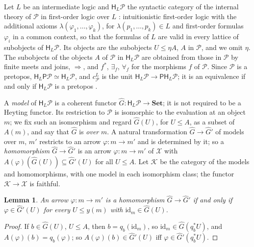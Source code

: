 \documentclass[11pt]{amsart}
\newtheorem{lem}[thm]{Lemma}
\theoremstyle{definition}
\newcommand{\Set}{\mathbf{Set}}
\newcommand{\PP}{\mathsf P}
\newcommand{\HH}{\mathsf H}
\newcommand{\cX}{\mathcal X}
\newcommand{\cP}{\mathcal P}
\newcommand{\cK}{\mathcal K}
\newcommand{\id}{\mathrm{id}}
\begin{document}
Let $L$ be an intermediate logic and $\HH_L\cP$ the syntactic category
of the internal theory of $\cP$ in first-order logic over $L$
\cite[\S2]{Interm}: intuitionistic first-order logic with the
additional axioms $\lambda(\varphi_1,\dots,\varphi_k)$, for
$\lambda(p_1,\dots,p_k)\in L$ and first-order formulas $\varphi_i$ in
a common context, so that the formulas of $L$ are valid in every
lattice of subobjects of $\HH_L\cP$. Its objects are the subobjects
$U\le\eta A$, $A$ in $\cP$, and we omit $\eta$. The subobjects of the objects $A$ of $\cP$
in $\HH_L\cP$ are obtained from those in $\cP$ by finite meets and
joins, $\Rightarrow$, and $f^*$, $\exists_f$, $\forall_f$ for the
morphisms $f$ of $\cP$. Since $\cP$ is a pretopos, $\HH_L\PP\cP\simeq
\HH_L\cP$, and $c^L_\cP$ is the unit $\HH_L\cP\to\PP\HH_L\cP$; it is an
equivalence if and only if $\HH_L\cP$ is a pretopos
\cite[Lemma~2.2]{Interm}.

A \emph{model} of $\HH_L\cP$ is a coherent functor $\hat G\colon
\HH_L\cP\to\Set$; it is not required to be a Heyting functor. Its restriction to $\cP$ is isomorphic to the
evaluation at an object $m$; we fix such an isomorphism and regard
$\hat G(U)$, for $U\le A$, as a subset of $A(m)$, and say that $\hat G$
is \emph{over} $m$. A natural transformation $\hat G\to\hat G'$ of
models over $m$, $m'$ restricts to an arrow $\varphi\colon m\to m'$ and
is determined by it; so a \emph{homomorphism} $\hat G\to\hat G'$ is an
arrow $\varphi\colon m\to m'$ of $\cX$ with $A(\varphi)(\hat G(U))
\subseteq\hat G'(U)$ for all $U\le A$. Let $\cK$ be the category of the
models and homomorphisms, with one model in each isomorphism class; the
functor $\cK\to\cX$ is faithful.

\begin{lem}\label{lem:generic}
An arrow $\varphi\colon m\to m'$ is a homomorphism $\hat G\to\hat G'$
if and only if $\varphi\in\hat G'(U)$ for every $U\le y(m)$ with
$\id_m\in\hat G(U)$.
\end{lem}
\begin{proof}
If $b\in\hat G(U)$, $U\le A$, then $b=q_b(\id_m)$, so $\id_m\in\hat
G(q_b^*U)$, and $A(\varphi)(b)=q_b(\varphi)$; so $A(\varphi)(b)\in\hat
G'(U)$ iff $\varphi\in\hat G'(q_b^*U)$.
\end{proof}
\end{document}

